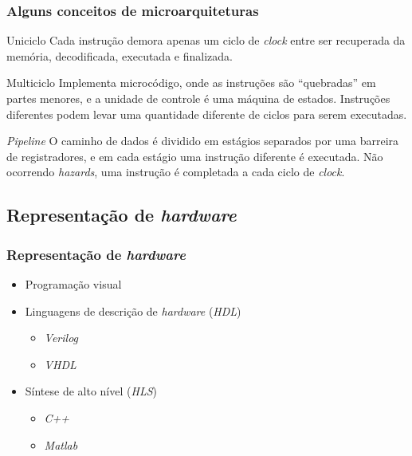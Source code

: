 \documentclass[aspectratio=169]{beamer}
\begin{document}
    \begin{frame}
        \frametitle{Alguns conceitos de microarquiteturas}
        \vfill
        \begin{block}{Uniciclo}
            {Cada instrução demora apenas um ciclo de \textit{clock} entre ser recuperada
                da memória, decodificada, executada e finalizada.
            }
        \end{block}
        \begin{block}{Multiciclo}
            { Implementa microcódigo, onde as instruções são ``quebradas'' em partes
                menores, e a unidade de controle é uma máquina de estados. Instruções
                diferentes podem levar uma quantidade diferente de ciclos para serem
                executadas.
            }
        \end{block}
        \begin{block}{\textit{Pipeline}}
            { O caminho de dados é dividido em estágios separados por uma barreira
                de registradores, e em cada estágio uma instrução diferente é executada.
                Não ocorrendo \textit{hazards}, uma instrução é completada a cada ciclo
                de \textit{clock}.
            }
        \end{block}
        \vfill
    \end{frame}

    \subsection{Representação de \textit{hardware}}
    \begin{frame}
        \frametitle{Representação de \textit{hardware}}
        \vfill
        \begin{itemize}
            \item Programação visual
            \item Linguagens de descrição de \textit{hardware} (\textit{HDL})
            \begin{itemize}
                \item \textit{Verilog}
                \item \textit{VHDL}
            \end{itemize}
            \item Síntese de alto nível (\textit{HLS})
            \begin{itemize}
                \item \textit{C++}
                \item \textit{Matlab}
            \end{itemize}
        \end{itemize}
        \vfill
    \end{frame}
\end{document}
